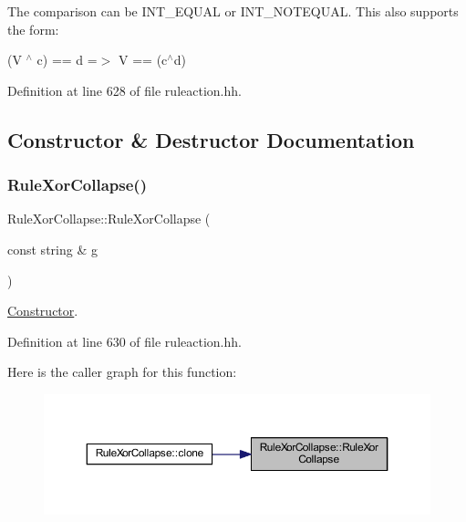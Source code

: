 The comparison can be I\+N\+T\+\_\+\+E\+Q\+U\+AL or I\+N\+T\+\_\+\+N\+O\+T\+E\+Q\+U\+AL. This also supports the form\+:
\begin{DoxyItemize}
\item {\ttfamily (V $^\wedge$ c) == d =$>$ V == (c$^\wedge$d)} 
\end{DoxyItemize}

Definition at line 628 of file ruleaction.\+hh.



\subsection{Constructor \& Destructor Documentation}
\mbox{\label{class_rule_xor_collapse_aff446187c0a50efe605d0371cc3aa23b}} 
\subsubsection{\texorpdfstring{RuleXorCollapse()}{RuleXorCollapse()}}
{\footnotesize\ttfamily Rule\+Xor\+Collapse\+::\+Rule\+Xor\+Collapse (\begin{DoxyParamCaption}\item[{const string \&}]{g }\end{DoxyParamCaption})\hspace{0.3cm}{\ttfamily [inline]}}



\mbox{\hyperlink{class_constructor}{Constructor}}. 



Definition at line 630 of file ruleaction.\+hh.

Here is the caller graph for this function\+:
\nopagebreak
\begin{figure}[H]
\begin{center}
\leavevmode
\includegraphics[width=350pt]{class_rule_xor_collapse_aff446187c0a50efe605d0371cc3aa23b_icgraph}
\end{center}
\end{figure}


